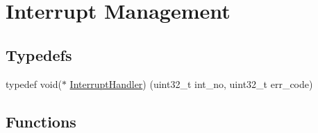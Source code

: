 \hypertarget{group__interrupt__man}{}\section{Interrupt Management}
\label{group__interrupt__man}
\subsection*{Typedefs}
\begin{DoxyCompactItemize}
\item 
typedef void($\ast$ \hyperlink{group__interrupt__man_ga018c3952c089b6c66a8c04d5626b5d56}{Interrupt\+Handler}) (uint32\+\_\+t int\+\_\+no, uint32\+\_\+t err\+\_\+code)
\end{DoxyCompactItemize}
\subsection*{Functions}
